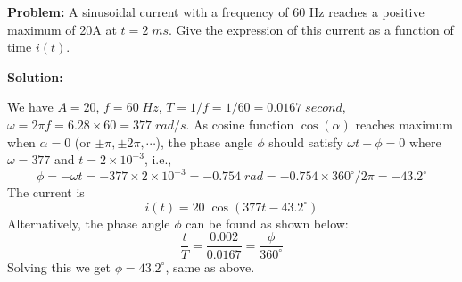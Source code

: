 \usepackage{html}



{\bf Problem:} A sinusoidal current with a frequency of 60 Hz reaches
a positive maximum of 20A at $t=2 \; ms$. Give the expression of this
current as a function of time $i(t)$.

{\bf Solution:}

We have $A=20$, $f=60\;Hz$, $T=1/f=1/60=0.0167\;second$, 
$\omega=2\pi f=6.28\times 60=377\;rad/s$. As cosine function 
$\cos(\alpha)$ reaches maximum when $\alpha=0$ (or $\pm \pi, \pm 2\pi, 
\cdots$), the phase angle $\phi$ should satisfy $\omega t+\phi=0$ 
where $\omega=377$ and $t=2\times 10^{-3}$, i.e.,
\[	\phi=-\omega t=-377 \times 2 \times 10^{-3}=-0.754\; rad 
	=-0.754\times 360^\circ /2\pi=-43.2^\circ	\]
The current is
\[	i(t)=20\;\cos(377 t-43.2^\circ)	\]
Alternatively, the phase angle $\phi$ can be found as shown below:
\[	\frac{t}{T}=\frac{0.002}{0.0167}=\frac{\phi}{360^\circ} \]
Solving this we get $\phi=43.2^\circ$, same as above.



